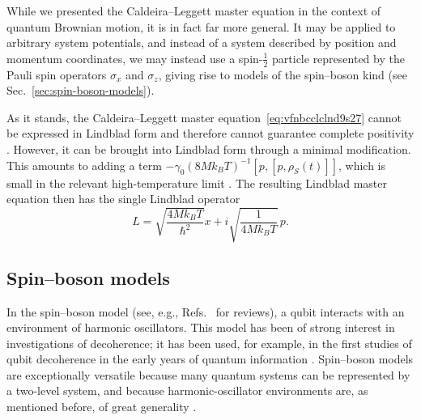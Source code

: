 \documentclass[3p,sort&compress,12pt]{elsarticle}
\newcommand{\I}{\ensuremath{i}}
\newcommand{\op}[1]{#1}
\begin{document}
While we presented the Caldeira--Leggett master equation in the context of quantum Brownian motion, it is in fact far more general.  It may be applied to arbitrary system potentials, and instead of a system described by position and momentum coordinates, we may instead use a spin-$\frac{1}{2}$ particle represented by the Pauli spin operators $\op{\sigma}_x$ and $\op{\sigma}_z$, giving rise to models of the spin--boson kind (see Sec.~\ref{sec:spin-boson-models}). 

As it stands, the Caldeira--Leggett master equation~\eqref{eq:vfnbcclclnd9s27} cannot be expressed in Lindblad form and therefore cannot guarantee complete positivity \cite{Breuer:2002:oq}. However, it can be brought into Lindblad form through a minimal modification. This amounts to adding a term $-\gamma_0(8Mk_B T)^{-1} [p,[p, \op{\rho}_S(t)]]$, which is small in the relevant high-temperature limit \cite{Breuer:2002:oq}. The resulting Lindblad master equation then has the single Lindblad operator 
%
\begin{equation}\label{eq:dkvnkl1}
\op{L} = \sqrt{\frac{4Mk_B T}{\hbar^2}}\op{x} + \I \sqrt{\frac{1}{4Mk_B T}} \,\op{p}.
\end{equation}
%


\subsection{\label{sec:spin-boson-models}Spin--boson models}

In the spin--boson model (see, e.g., Refs.~\cite{Leggett:1987:pm,Breuer:2002:oq,Schlosshauer:2007:un} for reviews), a qubit interacts with an environment of harmonic oscillators. This model has been of strong interest in investigations of decoherence; it has been used, for example, in the first studies of qubit decoherence in the early years of quantum information \cite{Unruh:1995:uy,Palma:1996:yy}. Spin--boson models are exceptionally versatile because many quantum systems can be represented by a two-level system, and because harmonic-oscillator environments are, as mentioned before, of great generality \cite{Feynman:1963:jj,Caldeira:1983:gv}. 
\end{document}
